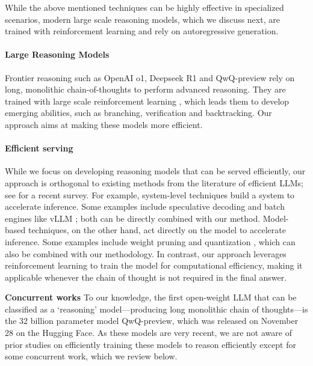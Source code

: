 While the above mentioned techniques 
can be highly effective in specialized scenarios, 
modern large scale reasoning models, which we discuss next,
are trained with reinforcement learning and rely on autoregressive generation. 

\paragraph{Large Reasoning Models}
Frontier reasoning such as OpenAI o1, Deepseek R1 and QwQ-preview rely on long, monolithic chain-of-thoughts to perform advanced reasoning.   
They are trained with large scale reinforcement learning \cite{guo2025deepseek}, which leads them to develop emerging abilities, such as branching, verification and backtracking. 
Our approach aims at making these models more efficient.
\vspace{-0.7em}
\paragraph{Efficient serving}
While we focus on developing reasoning models that can be served efficiently, our approach is orthogonal to existing methods from the literature of efficient LLMs; see \citet{zhou2024surveyefficientinferencelarge} for a recent survey. 
For example, system-level techniques
build a system to accelerate inference. Some examples include speculative decoding \cite{leviathan2023fast} and batch engines like vLLM \cite{kwon2023efficient}; both can be directly combined with our method. Model-based techniques, on the other hand, act directly on the model to accelerate inference. Some examples include weight pruning \cite{liu2018rethinking} and quantization \cite{lin2024awq}, which can also be combined with our methodology.
In contrast, our approach leverages reinforcement learning to train the model for computational efficiency, making it applicable whenever the chain of thought is not required in the final answer.

\textbf{Concurrent works}
To our knowledge, 
the first open-weight LLM that can be classified as a `reasoning' model---producing long monolithic chain of thoughts---is the 32 billion parameter model QwQ-preview, which was released on November 28 on the Hugging Face.
As these models are very recent, we are not aware of prior studies on efficiently training these models to reason efficiently except for some concurrent work, which we review below.

